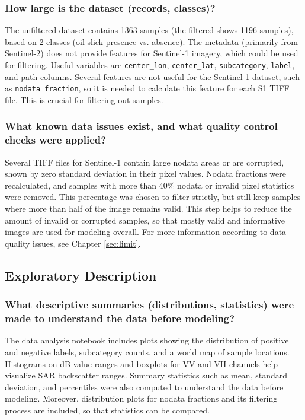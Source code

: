 \documentclass[sigconf]{acmart}
\begin{document}
\subsubsection{How large is the dataset (records, classes)?} The unfiltered dataset contains 1363 samples (the filtered shows 1196 samples), based on 2 classes (oil slick presence vs. absence). The metadata (primarily from Sentinel-2) does not provide features for Sentinel-1 imagery, which could be used for filtering. Useful variables are \texttt{center\_lon}, \texttt{center\_lat}, \texttt{subcategory}, \texttt{label}, and path columns. Several features are not useful for the Sentinel-1 dataset, such as \texttt{nodata\_fraction}, so it is needed to calculate this feature for each S1 TIFF file. This is crucial for filtering out samples.
\subsubsection{What known data issues exist, and what quality control checks were applied?} Several TIFF files for Sentinel-1 contain large nodata areas or are corrupted, shown by zero standard deviation in their pixel values. Nodata fractions were recalculated, and samples with more than 40\% nodata or invalid pixel statistics were removed. This percentage was chosen to filter strictly, but still keep samples where more than half of the image remains valid. This step helps to reduce the amount of invalid or corrupted samples, so that mostly valid and informative images are used for modeling overall. For more information according to data quality issues, see Chapter \ref{sec:limit}.

\subsection{Exploratory Description}
\subsubsection{What descriptive summaries (distributions, statistics) were made to understand the data before modeling?} The data analysis notebook includes plots showing the distribution of positive and negative labels, subcategory counts, and a world map of sample locations. Histograms on dB value ranges and boxplots for VV and VH channels help visualize SAR backscatter ranges. Summary statistics such as mean, standard deviation, and percentiles were also computed to understand the data before modeling. Moreover, distribution plots for nodata fractions and its filtering process are included, so that statistics can be compared.
\end{document}
